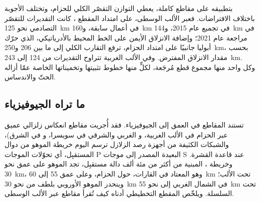 بتطبيقه على مقاطع كاملة، يعطي التوازن التقصّر الكلي للحزام، وتختلف الأجوبة
باختلاف الافتراضات. فعبر الألب الوسطى، على امتداد المقطع ، كانت التقديرات
للتقصّر التصادمي نحو \qty{125}{km} في أعمال سابقة، و\qty{160}{km} في
تجميع عام 2015، و\qty{144}{km} في مراجعة عام 2021؛ وإضافة الانزلاق الأيمن على الخط المحيط بالأدرياتيكي، الذي
حرّك أبوليا جانبيًا على امتداد الحزام، ترفع التقارب الكلي إلى ما بين 206
و\qty{250}{km}، بحسب مقدار الانزلاق المفترض. وفي الألب الغربية تتراوح التقديرات
من 124 إلى \qty{243}{km}. وكل واحد منها مجموع قطع مُرجَعة، لكلٍّ منها
خطوط تثبيتها وتخميناتها الخاصة عمّا أزاله الحتّ والاندساس.

\subsection*{ما تراه الجيوفيزياء}

تستند المقاطع في العمق إلى الجيوفيزياء. فقد أُجريت مقاطع انعكاس زلزالي عميق
عبر الحزام  في الألب الغربية، و الغربي والشرقي في
سويسرا، و في الشرق)، والشبكات الكثيفة من أجهزة رصد الزلازل ترسم اليوم خريطة الموهو
من دوال المستقبِل، أي تحوّلات الموجات P البعيدة المصدر إلى موجات S عند قاعدة
القشرة. وخريطة ، المبنية من أكثر من مئة ألف دالة مستقبِل،
تجد الموهو على عمق نحو \qty{30}{km}، وهو المعتاد في القارات، حول الحزام، وعلى عمق 55 إلى
\qty{60}{km} تحت الألب؛ وينحدر الموهو الأوروبي بلطف من نحو \qty{30}{km} في
الشمال الغربي إلى نحو \qty{55}{km} تحت السلسلة.
ويلخّص المقطع التخطيطي أدناه كيف تُقرأ مقاطع  عبر الألب
الوسطى.

